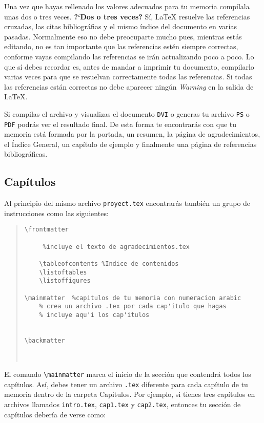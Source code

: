 Una  vez que hayas rellenado los valores adecuados para tu memoria comp\'ilala unas
dos o tres veces. \textbf{?`Dos o tres veces?} S\'i, \LaTeX{} resuelve las
referencias cruzadas, las citas bibliogr\'afias y el mismo \'indice del documento
en varias pasadas. Normalmente eso no debe preocuparte mucho pues, mientras
est\'as editando, no es tan importante que las referencias est\'en siempre
correctas, conforme vayas compilando las referencias se ir\'an actualizando
poco a poco. Lo que s\'i debes recordar es, antes de mandar a imprimir tu
documento, compilarlo varias veces para que se resuelvan correctamente todas
las referencias. Si todas las referencias est\'an correctas no debe aparecer
ning\'un \emph{Warning} en la salida de \LaTeX{}.

Si compilas el archivo y visualizas el documento \texttt{DVI} o generas tu archivo \texttt{PS} o \texttt{PDF} 
podr\'as ver el resultado final. De esta forma te encontrar\'as con que tu memoria est\'a formada por la portada, 
un resumen, la p\'agina de agradecimientos, el \'Indice General, un cap\'itulo de ejemplo y finalmente una p\'agina 
de referencias bibliogr\'aficas.


\subsection{Cap\'itulos}

Al principio del mismo archivo \texttt{proyect.tex} encontrar\'as tambi\'en un grupo de
instrucciones como las siguientes:
\\

\begin{quote}
\begin{verbatim}
\frontmatter
  
 	 %incluye el texto de agradecimientos.tex
	
	\tableofcontents %Indice de contenidos
 	\listoftables
 	\listoffigures

\mainmatter  %capitulos de tu memoria con numeracion arabic
 	% crea un archivo .tex por cada cap'itulo que hagas
	% incluye aqu'i los cap'itulos	
 	
 	
\backmatter
	
	
\end{verbatim}
\end{quote}

El comando \verb|\mainmatter| marca el inicio de la secci\'on que contendr\'a todos los cap\'itulos.
As\'i, debes tener un archivo \texttt{.tex} diferente para cada cap\'itulo de tu memoria dentro de la carpeta Capitulos. 
Por ejemplo, si tienes tres cap\'itulos en archivos llamados \texttt{intro.tex}, \texttt{cap1.tex} y \texttt{cap2.tex},
entonces tu secci\'on de cap\'itulos deber\'ia de verse como:

